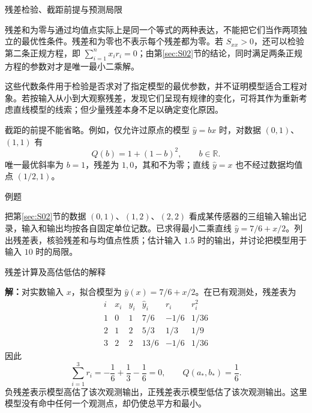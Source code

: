 \documentclass[aspectratio=169,10pt,fontset=fandol]{ctexbeamer}
\begin{document}
\begin{frame}[t,fragile]{残差检验、截距前提与预测局限}
\normalsize
{\normalsize
残差和为零与通过均值点实际上是同一个等式的两种表达，不能把它们当作两项独立的最优性条件。残差和为零也不表示每个残差都为零。若 $S_{xx}>0$，还可以检验第二条正规方程，即 $\sum_{i=1}^{n}x_i r_i=0$；由第\ref{sec:S02}节的结论，同时满足两条正规方程的参数对才是唯一最小二乘解。


}
{\normalsize
这些代数条件用于检验是否求对了指定模型的最优参数，并不证明模型适合工程对象。若按输入从小到大观察残差，发现它们呈现有规律的变化，可将其作为重新考虑直线模型的线索；但少量残差本身不足以确定变化原因。


}
{\normalsize
截距的前提不能省略。例如，仅允许过原点的模型 $\hat{y}=bx$ 时，对数据 $(0,1)$、$(1,1)$ 有
\[
Q(b)=1+(1-b)^2,\qquad b\in\mathbb{R}.
\]
唯一最优斜率为 $b=1$，残差为 $1,0$，其和不为零；直线 $\hat{y}=x$ 也不经过数据均值点 $(1/2,1)$。\par

}
\begin{block}{例题}
{\normalsize
把第\ref{sec:S02}节的数据 $(0,1)$、$(1,2)$、$(2,2)$ 看成某传感器的三组输入输出记录，输入和输出均按各自固定单位记数。已求得最小二乘直线 $\hat{y}=7/6+x/2$。列出残差表，核验残差和与均值点性质；估计输入 $1.5$ 时的输出，并讨论把模型用于输入 $10$ 时的局限。

}
\end{block}
\end{frame}
\begin{frame}[t,fragile]{残差计算及高估低估的解释}
\footnotesize
{\footnotesize
\par\noindent\textbf{解：}对实数输入 $x$，拟合模型为 $\hat{y}(x)=7/6+x/2$。在已有观测处，残差表为
\[
\begin{array}{c|r|r|r|r|r}
i&x_i&y_i&\hat{y}_i&r_i&r_i^2\\ \hline
1&0&1&7/6&-1/6&1/36\\
2&1&2&5/3&1/3&1/9\\
3&2&2&13/6&-1/6&1/36
\end{array}
\]
因此
\[
\sum_{i=1}^{3}r_i=-\frac16+\frac13-\frac16=0,
\qquad Q(a_*,b_*)=\frac16.
\]
负残差表示模型高估了该次观测输出，正残差表示模型低估了该次观测输出。这里模型没有命中任何一个观测点，却仍使总平方和最小。


}
\end{frame}
\end{document}
